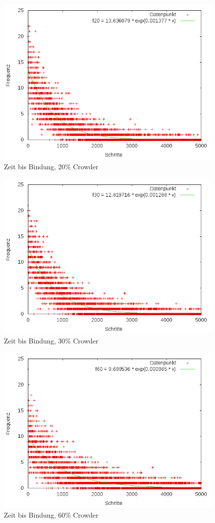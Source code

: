 \documentclass[bachelor,       %
               twoside,        %
               BCOR10mm,       %
               english,ngerman, %
               ]{GAUBM}
\begin{document}
\begin{figure}
  \centering
  \includegraphics[width=0.9\linewidth]{find20.png}
  \caption{Zeit bis Bindung, 20$\%$ Crowder}
  \label{fig:cr20}
\end{figure}

\begin{figure}
  \centering
  \includegraphics[width=0.9\linewidth]{find30.png}
  \caption{Zeit bis Bindung, 30$\%$ Crowder}
  \label{fig:cr30}
\end{figure}

\begin{figure}
  \centering
  \includegraphics[width=0.9\linewidth]{find60.png}
  \caption{Zeit bis Bindung, 60$\%$ Crowder}
  \label{fig:cr60}
\end{figure}
\end{document}
